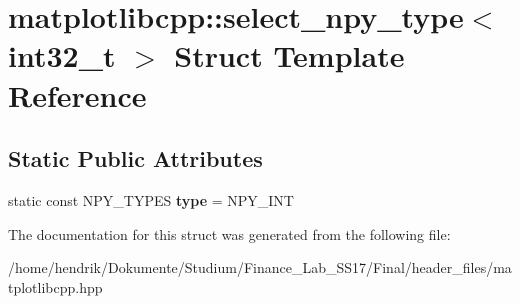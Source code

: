 \hypertarget{structmatplotlibcpp_1_1select__npy__type_3_01int32__t_01_4}{}\section{matplotlibcpp\+:\+:select\+\_\+npy\+\_\+type$<$ int32\+\_\+t $>$ Struct Template Reference}
\label{structmatplotlibcpp_1_1select__npy__type_3_01int32__t_01_4}
\subsection*{Static Public Attributes}
\begin{DoxyCompactItemize}
\item 
static const N\+P\+Y\+\_\+\+T\+Y\+P\+ES {\bfseries type} = N\+P\+Y\+\_\+\+I\+NT\hypertarget{structmatplotlibcpp_1_1select__npy__type_3_01int32__t_01_4_abcfd0c3dc5d5e92575c04747315cb4d5}{}\label{structmatplotlibcpp_1_1select__npy__type_3_01int32__t_01_4_abcfd0c3dc5d5e92575c04747315cb4d5}

\end{DoxyCompactItemize}


The documentation for this struct was generated from the following file\+:\begin{DoxyCompactItemize}
\item 
/home/hendrik/\+Dokumente/\+Studium/\+Finance\+\_\+\+Lab\+\_\+\+S\+S17/\+Final/header\+\_\+files/matplotlibcpp.\+hpp\end{DoxyCompactItemize}

